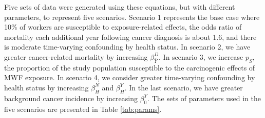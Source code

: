 \documentclass[
  11pt,
]{article}
\begin{document}
Five sets of data were generated using these equations, but with
different parameters, to represent five scenarios. Scenario 1 represents
the base case where 10\% of workers are susceptible to exposure-related
effects, the odds ratio of mortality each additional year following
cancer diagnosis is about 1.6, and there is moderate time-varying
confounding by health status. In scenario 2, we have greater
cancer-related mortality by increasing \(\beta_{\bar Y}^D\). In scenario
3, we increase \(p_S\), the proportion of the study population
susceptible to the carcinogenic effects of MWF exposure. In scenario 4,
we consider greater time-varying confounding by health status by
increasing \(\beta_H^N\) and \(\beta_H^Y\). In the last scenario, we
have greater background cancer incidence by increasing \(\beta_0^Y\).
The sets of parameters used in the five scenarios are presented in Table
\ref{tab:params}.
\end{document}
